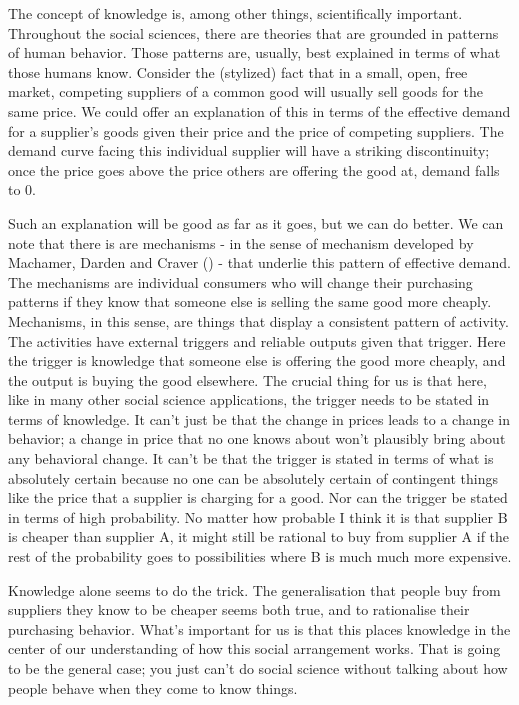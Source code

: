 \documentclass[
  10pt,
  letterpaper,
  twoside]{scrbook}
\begin{document}
The concept of knowledge is, among other things, scientifically
important. Throughout the social sciences, there are theories that are
grounded in patterns of human behavior. Those patterns are, usually,
best explained in terms of what those humans know. Consider the
(stylized) fact that in a small, open, free market, competing suppliers
of a common good will usually sell goods for the same price. We could
offer an explanation of this in terms of the effective demand for a
supplier's goods given their price and the price of competing suppliers.
The demand curve facing this individual supplier will have a striking
discontinuity; once the price goes above the price others are offering
the good at, demand falls to 0.

Such an explanation will be good as far as it goes, but we can do
better. We can note that there is are mechanisms - in the sense of
mechanism developed by Machamer, Darden and Craver
() - that underlie this pattern of
effective demand. The mechanisms are individual consumers who will
change their purchasing patterns if they know that someone else is
selling the same good more cheaply. Mechanisms, in this sense, are
things that display a consistent pattern of activity. The activities
have external triggers and reliable outputs given that trigger. Here the
trigger is knowledge that someone else is offering the good more
cheaply, and the output is buying the good elsewhere. The crucial thing
for us is that here, like in many other social science applications, the
trigger needs to be stated in terms of knowledge. It can't just be that
the change in prices leads to a change in behavior; a change in price
that no one knows about won't plausibly bring about any behavioral
change. It can't be that the trigger is stated in terms of what is
absolutely certain because no one can be absolutely certain of
contingent things like the price that a supplier is charging for a good.
Nor can the trigger be stated in terms of high probability. No matter
how probable I think it is that supplier B is cheaper than supplier A,
it might still be rational to buy from supplier A if the rest of the
probability goes to possibilities where B is much much more expensive.

Knowledge alone seems to do the trick. The generalisation that people
buy from suppliers they know to be cheaper seems both true, and to
rationalise their purchasing behavior. What's important for us is that
this places knowledge in the center of our understanding of how this
social arrangement works. That is going to be the general case; you just
can't do social science without talking about how people behave when
they come to know things.
\end{document}
